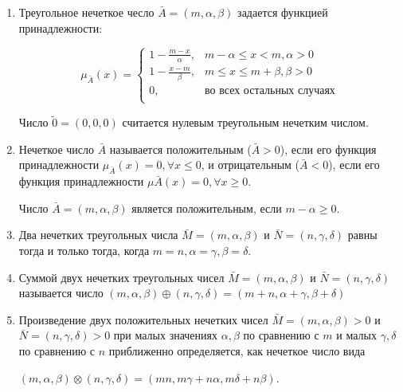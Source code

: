 \documentclass[12pt]{article}
\begin{document}
\begin{enumerate}
	\item Треугольное нечеткое чесло $ \bar{A} = (m, \alpha, \beta) $ задается
	      функцией принадлежности:


	      $$
		      \mu_{\bar{A}} (x) = \begin{cases}
			      1 - \frac{m - x}{\alpha}, & m - \alpha \leq x < m, \alpha > 0  \\
			      1 - \frac{x - m}{\beta},  & m \leq x \leq m + \beta, \beta > 0 \\
			      0,                        & \text{во всех остальных случаях}   \\
		      \end{cases}
	      $$

	      Число $\tilde{0} = (0, 0, 0)$  считается нулевым треугольным нечетким
	      числом.


	\item
	      Нечеткое число $\bar{A}$ называется положительным ($\bar{A} > 0$), если его
	      функция принадлежности $\mu_{\bar{A}}(x) = 0, \forall x \leq 0$, и
	      отрицательным ($\bar{A} < 0$), если его функция принадлежности
	      $\mu{\bar{A}}(x) = 0, \forall x \geq 0$.

	      Число $\bar{A} = (m, \alpha, \beta)$ является положительным, если $m -
		      \alpha \geq 0$.

	\item
	      Два нечетких треугольных числа $\bar{M} = (m, \alpha, \beta)$ и $\bar{N} =
		      (n, \gamma, \delta)$ равны тогда и только тогда, когда
	      $m = n, \alpha = \gamma, \beta = \delta$.

	\item
	      Суммой двух нечетких треугольных чисел $\bar{M} = (m, \alpha, \beta)$ и
	      $\bar{N} = (n, \gamma, \delta)$ называется число
	      $ (m, \alpha, \beta) \oplus (n, \gamma, \delta) = (m + n, \alpha + \gamma,
		      \beta + \delta) $

	\item
	      Произведение двух положительных нечетких чисел $\bar{M} = (m, \alpha, \beta)
		      > 0$ и $ \bar{N} = (n, \gamma, \delta) > 0 $ при малых значениях $\alpha,
		      \beta$ по сравнению с $m$ и малых $\gamma, \delta$ по сравнению с $n$
	      приближенно определяется, как нечеткое число вида

	      $ (m, \alpha, \beta) \otimes (n, \gamma, \delta) = (mn, m\gamma + n \alpha,
		      m\delta + n \beta)$.


\end{enumerate}
\end{document}
